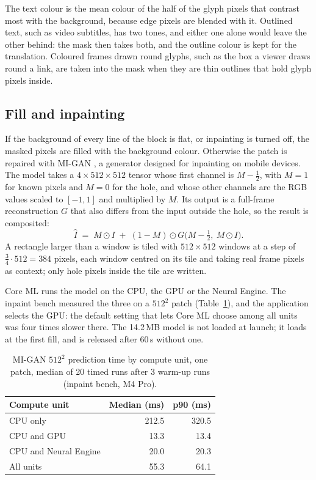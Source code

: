 The text colour is the mean colour of the half of the glyph pixels that contrast most with the background, because edge pixels
are blended with it. Outlined text, such as video subtitles, has two tones, and either one alone would leave the other behind:
the mask then takes both, and the outline colour is kept for the translation. Coloured frames drawn round glyphs, such as the
box a viewer draws round a link, are taken into the mask when they are thin outlines that hold glyph pixels inside.

\subsection{Fill and inpainting}

If the background of every line of the block is flat, or inpainting is turned off, the masked pixels are filled with the
background colour. Otherwise the patch is repaired with MI-GAN \citep{migan}, a generator designed for inpainting on mobile
devices. The model takes a $4\times512\times512$ tensor whose first channel is $M-\tfrac12$, with $M=1$ for known pixels and $M=0$ for the
hole, and whose other channels are the RGB values scaled to $[-1,1]$ and multiplied by $M$. Its output is a full-frame
reconstruction $G$ that also differs from the input outside the hole, so the result is composited:
\begin{equation}\label{eq:composite}
\hat I\;=\;M\odot I\;+\;(1-M)\odot G\bigl(M-\tfrac12,\ M\odot I\bigr).
\end{equation}
A rectangle larger than a window is tiled with $512\times512$ windows at a step of $\tfrac34\cdot512=384$ pixels, each window centred on its
tile and taking real frame pixels as context; only hole pixels inside the tile are written.

Core ML runs the model on the CPU, the GPU or the Neural Engine. The inpaint bench measured the three on a $512^2$ patch
(Table~\ref{tab:migan}), and the application selects the GPU: the default setting that lets Core ML choose among all units was four
times slower there. The 14.2\,MB model is not loaded at launch; it loads at the first fill, and is released after 60\,s without one.

\begin{table}[t]
\centering
\caption{MI-GAN $512^2$ prediction time by compute unit, one patch, median of 20 timed runs after 3 warm-up runs (inpaint bench,
M4 Pro).}\label{tab:migan}
\small
\begin{tabular}{@{}lrr@{}}
\toprule
Compute unit & Median (ms) & p90 (ms)\\
\midrule
CPU only & 212.5 & 320.5\\
CPU and GPU & 13.3 & 13.4\\
CPU and Neural Engine & 20.0 & 20.3\\
All units & 55.3 & 64.1\\
\bottomrule
\end{tabular}
\end{table}

